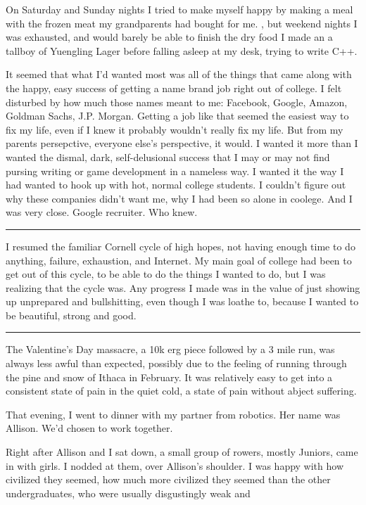 On Saturday and Sunday nights I tried to make myself happy by making a meal with
the frozen meat my grandparents had bought for me.  , but weekend nights I was
exhausted, and would barely be able to finish the dry food I made an a tallboy
of Yuengling Lager before falling asleep at my desk, trying to write C++.

It seemed that what I'd wanted most was all of the things that came along with
the happy, easy success of getting a name brand job right out of college.  I
felt disturbed by how much those names meant to me: Facebook, Google, Amazon,
Goldman Sachs, J.P. Morgan.  Getting a job like that seemed the easiest way to
fix my life, even if I knew it probably wouldn't really fix my life.  But from
my parents persepctive, everyone else's perspective, it would.  I wanted it more
than I wanted the dismal, dark, self-delusional success that I may or may not
find pursing writing or game development in a nameless way.  I wanted it the way
I had wanted to hook up with hot, normal college students.  I couldn't figure
out why these companies didn't want me, why I had been so alone in coolege.  And
I was very close.  Google recruiter.  Who knew.

\plainfancybreak{12pt}{2}{* * *}

I resumed the familiar Cornell cycle of high hopes, not having enough time to do
anything, failure, exhaustion, and Internet.  My main goal of college had been
to get out of this cycle, to be able to do the things I wanted to do, but I was
realizing that the cycle was.  Any progress I made was in the value of just
showing up unprepared and bullshitting, even though I was loathe to, because I
wanted to be beautiful, strong and good.

\plainfancybreak{12pt}{2}{* * *}

The Valentine's Day massacre, a 10k erg piece followed by a 3 mile run, was
always less awful than expected, possibly due to the feeling of running through
the pine and snow of Ithaca in February.  It was relatively easy to get into a
consistent state of pain in the quiet cold, a state of pain without abject
suffering. 

That evening, I went to dinner with my partner from robotics.  Her name was
Allison.  We'd chosen to work together.  

Right after Allison and I sat down, a small group of rowers, mostly Juniors,
came in with girls.  I nodded at them, over Allison's shoulder.  I was happy
with how civilized they seemed, how much more civilized they seemed than the
other undergraduates, who were usually disgustingly weak and

